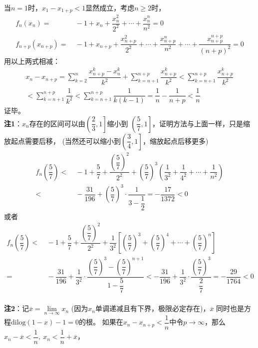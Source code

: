 \begin{enumerate}[label={【\textbf{例\thechapter.\arabic*}】},
 leftmargin=\inteval{\myenumleftmargin}pt,
 itemsep=\inteval{\myenumitempsep}pt,
 itemindent=\inteval{\myenumitemindent}pt]
当$ n=1 $时，$ x_1-x_{1+p}<1 $显然成立，考虑$ n\geq 2 $时，
\begin{align*}  %
    f_n(x_n)=&\ -1+x_n+\dfrac{x_n^2}{2^2}+\cdots+
    \dfrac{x_n^n}{n^2}=0  \\
    f_{n+p}(x_{n+p})=&\ -1+x_{n+p}+\dfrac{x_{n+p}^2}{2^2}+\cdots+
    \dfrac{x_{n+p}^n}{n^2}+\cdots+\dfrac{x_{n+p}^{n+p}}{(n+p)^2}
    =0 
\end{align*}
用以上两式相减：
\begin{gather}
    x_{n}-x_{n+p}=\sum_{k=2}^{n}\dfrac{x_{n+p}^k-x_{n}^k}{k^2}
    +\sum_{k=n+1}^{n+p}\dfrac{x_{n+p}^k}{k^2}< 
    \sum_{k=n+1}^{n+p}\dfrac{x_{n+p}^k}{k^2} \nonumber \\
    < \sum_{k=n+1}^{n+p}\dfrac{1}{k^2}<
    \sum_{k=n+1}^{n+p}\dfrac{1}{k(k-1)}=
    \dfrac{1}{n}-\dfrac{1}{n+p}<\dfrac{1}{n} \label{2013安徽数列收敛1}
\end{gather} 
证毕。\\
\textbf{注1}：$ x_n $存在的区间可以由$ \left(\dfrac{2}{3},1\right] $缩小到
$ \left(\dfrac{5}{7},1\right] $，证明方法与上面一样，只是缩放起点需要后移，
(当然还可以缩小到$ \left(\dfrac{3}{4},1\right] $，缩放起点后移更多)
\begin{align*}
    f_n\left(\dfrac{5}{7}\right)< &\ -1+\dfrac{5}{7}+\dfrac{(\dfrac{5}{7})^2}{2^2}
    +\left(\dfrac{5}{7}\right)^3\left(\dfrac{1}{3^2}+
    \dfrac{1}{4^2}+\cdots+\dfrac{1}{n^2}\right) \\
    <&\ -\dfrac{31}{196}+\left(\dfrac{5}{7}\right)^3
    \cdot \dfrac{1}{3-\dfrac{1}{2}}  =-\dfrac{17}{1372}<0
\end{align*}
或者
\begin{align*}
    f_n\left(\dfrac{5}{7}\right)< &\ -1+\dfrac{5}{7}+\dfrac{
        (\dfrac{5}{7})^2}{2^2}+\dfrac{1}{3^2}\left[\left(\dfrac{5}{7}\right)^3+
    \left(\dfrac{5}{7}\right)^4+\cdots+\left(\dfrac{5}{7}\right)^n\right]\\
    =&\ -\dfrac{31}{196}+\dfrac{1}{3^2}\cdot
    \dfrac{\left(\dfrac{5}{7}\right)^3-
        \left(\dfrac{5}{7}\right)^{n+1}}{1-\dfrac{5}{7}} 
    < -\dfrac{31}{196}+\dfrac{1}{3^2}\cdot\dfrac{\left(\dfrac{5}{7}\right)^3}
    {\dfrac{2}{7}}=-\dfrac{29}{1764}<0
\end{align*} \\
\textbf{注2}：记$ \overline{x}=\lim\limits_{n\to\infty}x_n $
(因为$ x_n $单调递减且有下界，极限必定存在)，$ \overline{x} $
同时也是方程$ \mathrm{dilog}(1-x)-1=0 $的根。
如果在$ x_n-x_{n+p}<\dfrac{1}{n} $中令$ p\to \infty $，那么
$ x_n-\overline{x}<\dfrac{1}{n},\ x_n<\dfrac{1}{n}+\overline{x} $，

\end{enumerate}
